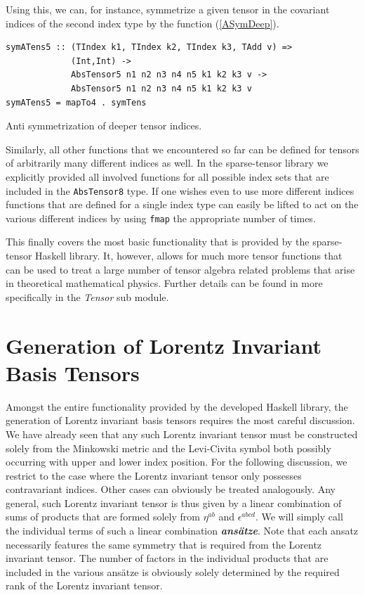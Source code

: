 \documentclass[a4paper,12pt, DIV=14, BCOR=5mm, twoside, headsepline, numbers=noenddot]{scrbook}
\begin{document}
Using this, we can, for instance, symmetrize a given tensor in the covariant indices of the second index type by the function (\ref{ASymDeep}).

\begin{listing}[hbt!]
\begin{verbatim}
symATens5 :: (TIndex k1, TIndex k2, TIndex k3, TAdd v) =>
             (Int,Int) ->
             AbsTensor5 n1 n2 n3 n4 n5 k1 k2 k3 v ->
             AbsTensor5 n1 n2 n3 n4 n5 k1 k2 k3 v
symATens5 = mapTo4 . symTens
\end{verbatim} 
\caption{Anti symmetrization of deeper tensor indices. }\label{ASymDeep}
\end{listing}

Similarly, all other functions that we encountered so far can be defined for tensors of arbitrarily many different indices as well. In the sparse-tensor library we explicitly provided all involved functions for all possible index sets that are included in the \texttt{AbsTensor8} type. If one wishes even to use more different indices functions that are defined for a single index type can easily be lifted to act on the various different indices by using \texttt{fmap} the appropriate number of times. 

This finally covers the most basic functionality that is provided by the sparse-tensor Haskell library. It, however, allows for much more tensor functions that can be used to treat a large number of tensor algebra related problems that arise in theoretical mathematical physics. 
Further details can be found in \cite{sparse-tensor} more specifically in the \textit{Tensor} sub module.

\section{Generation of Lorentz Invariant Basis Tensors}\label{LorentzGen}
Amongst the entire functionality provided by the developed Haskell library, the generation of Lorentz invariant basis tensors requires the most careful discussion. We have already seen that any such Lorentz invariant tensor must be constructed solely from the Minkowski metric and the Levi-Civita symbol both possibly occurring with upper and lower index position. For the following discussion, we restrict to the case where the Lorentz invariant tensor only possesses contravariant indices. Other cases can obviously be treated analogously. Any general, such Lorentz invariant tensor is thus given by a linear combination of sums of products that are formed solely from $\eta^{ab}$ and $\epsilon^{abcd}$.
We will simply call the individual terms of such a linear combination \textit{\textbf{ansätze}}. Note that each ansatz necessarily features the same symmetry that is required from the Lorentz invariant tensor. The number of factors in the individual products that are included in the various ansätze is obviously solely determined by the required rank of the Lorentz invariant tensor.
\end{document}

